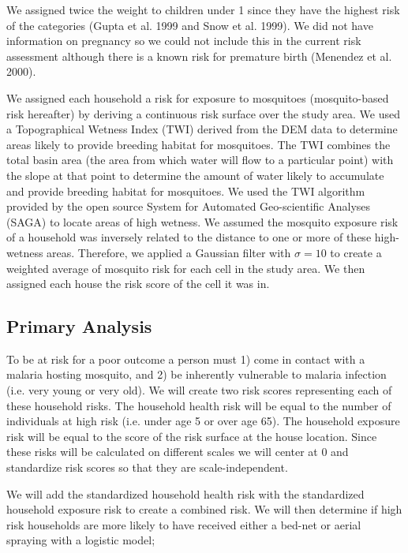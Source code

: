 \documentclass{article}\usepackage[]{graphicx}\usepackage[]{color}
\begin{document}
We assigned twice the weight to children under 1 since they have the highest risk of the categories (Gupta et al. 1999 and Snow et al. 1999).  We did not have information on pregnancy so we could not include this in the current risk assessment although there is a known risk for premature birth (Menendez et al. 2000).

We assigned each household a risk for exposure to mosquitoes (mosquito-based risk hereafter) by deriving a continuous risk surface over the study area.  We used a Topographical Wetness Index (TWI) derived from the DEM data to determine areas likely to provide breeding habitat for mosquitoes.  The TWI combines the total basin area (the area from which water will flow to a particular point) with the slope at that point to determine the amount of water likely to accumulate and provide breeding habitat for mosquitoes.  We used the TWI algorithm provided by the open source System for Automated Geo-scientific Analyses (SAGA) to locate areas of high wetness.  We assumed the mosquito exposure risk of a household was inversely related to the distance to one or more of these high-wetness areas.  Therefore,  we applied a Gaussian filter with $\sigma = 10$ to create a weighted average of mosquito risk for each cell in the study area.  We then assigned each house the risk score of the cell it was in.

\subsection{Primary Analysis}

To be at risk for a poor outcome a person must 1) come in contact with a malaria hosting mosquito,  and 2) be inherently vulnerable to malaria infection (i.e. very young or very old).  We will create two risk scores representing each of these household risks.  The household health risk will be equal to the number of individuals at high risk (i.e. under age 5 or over age 65).  The household exposure risk will be equal to the score of the risk surface at the house location.  Since these risks will be calculated on different scales we will center at 0 and standardize risk scores so that they are scale-independent.

We will add the standardized household health risk with the standardized household exposure risk to create a combined risk.  We will then determine if high risk households are more likely to have received either a bed-net or aerial spraying with a logistic model;
\end{document}

